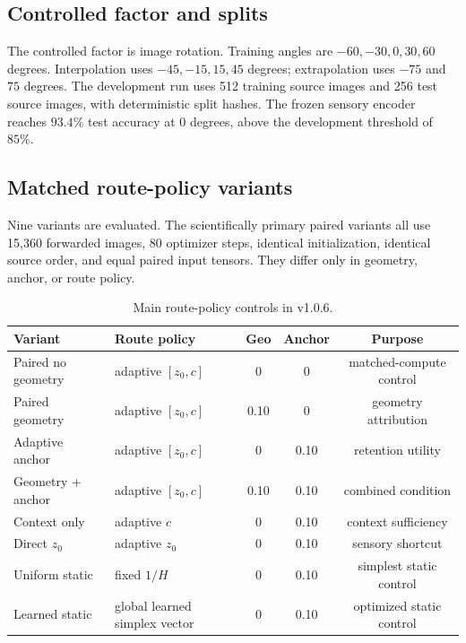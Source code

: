 \documentclass[11pt,a4paper]{article}
\begin{document}
\subsection{Controlled factor and splits}

The controlled factor is image rotation. Training angles are $-60,-30,0,30,60$ degrees. Interpolation uses $-45,-15,15,45$ degrees; extrapolation uses $-75$ and $75$ degrees. The development run uses 512 training source images and 256 test source images, with deterministic split hashes. The frozen sensory encoder reaches $93.4\%$ test accuracy at $0$ degrees, above the development threshold of $85\%$.

\subsection{Matched route-policy variants}

Nine variants are evaluated. The scientifically primary paired variants all use 15,360 forwarded images, 80 optimizer steps, identical initialization, identical source order, and equal paired input tensors. They differ only in geometry, anchor, or route policy.

\begin{table}[H]
\centering
\small
\begin{tabularx}{\textwidth}{p{4.5cm}Yccc}
\toprule
\textbf{Variant} & \textbf{Route policy} & \textbf{Geo} & \textbf{Anchor} & \textbf{Purpose}\\
\midrule
Paired no geometry & adaptive $[z_0,c]$ & 0 & 0 & matched-compute control\\
Paired geometry & adaptive $[z_0,c]$ & 0.10 & 0 & geometry attribution\\
Adaptive anchor & adaptive $[z_0,c]$ & 0 & 0.10 & retention utility\\
Geometry + anchor & adaptive $[z_0,c]$ & 0.10 & 0.10 & combined condition\\
Context only & adaptive $c$ & 0 & 0.10 & context sufficiency\\
Direct $z_0$ & adaptive $z_0$ & 0 & 0.10 & sensory shortcut\\
Uniform static & fixed $1/H$ & 0 & 0.10 & simplest static control\\
Learned static & global learned simplex vector & 0 & 0.10 & optimized static control\\
\bottomrule
\end{tabularx}
\caption{Main route-policy controls in v1.0.6.}
\end{table}
\end{document}
